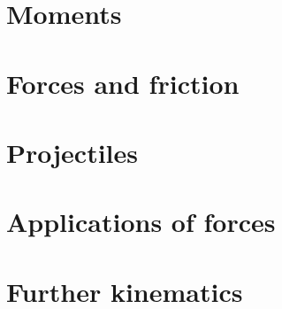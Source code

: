\chapter{Moments}


\chapter{Forces and friction}


\chapter{Projectiles}


\chapter{Applications of forces}


\chapter{Further kinematics}

